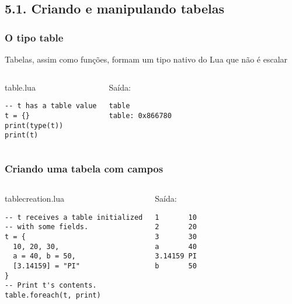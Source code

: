 \documentclass[brazil]{beamer}
\begin{document}
\subsection{5.1. Criando e manipulando tabelas}
\begin{frame}[fragile]
  \frametitle{O tipo table}
  \pause
  \begin{center}
    Tabelas, assim como funções, formam um tipo nativo do Lua
    que não é escalar
  \end{center}
  \pause
  \begin{columns}
      \begin{block}{table.lua}
        \begin{lstlisting}
-- t has a table value
t = {}
print(type(t))
print(t)
        \end{lstlisting}
      \end{block}
    \pause
      \begin{block}{Saída:}
        \begin{verbatim}
table
table: 0x866780  \end{verbatim}
      \end{block}
  \end{columns}
\end{frame}
\begin{frame}[fragile]
  \frametitle{Criando uma tabela com campos}
  \pause
  \begin{columns}
      \begin{block}{tablecreation.lua}
        \begin{lstlisting}
-- t receives a table initialized
-- with some fields.
t = {
  10, 20, 30,
  a = 40, b = 50,
  [3.14159] = "PI"
}
-- Print t's contents.
table.foreach(t, print)
        \end{lstlisting}
      \end{block}
    \pause
      \begin{block}{Saída:}
        \begin{verbatim}
1       10
2       20
3       30
a       40
3.14159 PI
b       50  \end{verbatim}
      \end{block}
  \end{columns}
\end{frame}
\end{document}
